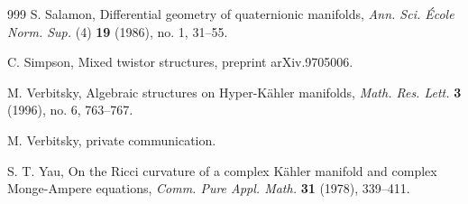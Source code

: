 \documentclass[11pt]{amsart}
\theoremstyle{definition}
\theoremstyle{plain}
\theoremstyle{definition}
\theoremstyle{plain}
\theoremstyle{remark}
\theoremstyle{plain}
\begin{document}
\begin{thebibliography}{999}
 S. Salamon, Differential geometry of quaternionic manifolds, 
\emph{Ann. Sci. \'Ecole Norm. Sup. }(4) \textbf{19} (1986), no. 1, 31--55.

 C. Simpson, Mixed twistor structures,  preprint  arXiv.9705006.


 M. Verbitsky, Algebraic structures on Hyper-K\"ahler manifolds, \emph{Math. Res. Lett.}  \textbf{3} (1996), no. 6, 763--767.

 M. Verbitsky, private communication.

 S. T. Yau,  On the Ricci curvature of a complex K\"ahler manifold and complex Monge-Ampere
equations, \emph{Comm. Pure Appl. Math.}  \textbf{31} (1978),  339--411.

\end{thebibliography}
\end{document}
